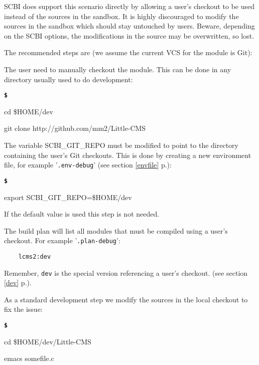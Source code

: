 \documentclass[a4paper,12pt,twoside]{article}
\newenvironment{shellcommand}{
	\begin{list}{ %
			\bfseries\texttt \$
		}{ %
			\ttfamily
			\setlength{\topsep}{-0.3ex}
			\setlength{\labelwidth}{1in}
			\setlength{\leftmargin}{0.7in}
			\setlength{\labelsep}{0.5ex}
			\setlength{\rightmargin}{0.5in}
			\setlength{\itemsep}{1ex}
			\setlength{\parsep}{0ex}
			\setlength{\listparindent}{0.5in}
		}
	}{
	\end{list}
}
\newcommand{\code}[1]{\texttt{#1}}
\newcommand{\seeref}[1]{see section \ref{#1} p.\pageref{#1}}
\newcommand{\file}[1]{'{\texttt{#1}}'}
\begin{document}
SCBI does support this scenario directly by allowing a user's checkout to be used instead of the sources in the sandbox. It is highly discouraged to modify the sources in the sandbox which should stay untouched by users. Beware, depending on the SCBI options, the modifications in the source may be overwritten, so lost.

The recommended steps are (we assume the current VCS for the module is Git):

\begin{description}[style=nextline]
	\item[Checkout the module] The user need to manually checkout the module. This can be done in any directory usually used to do development:

	\begin{shellcommand}
	\item cd \$HOME/dev
	\item git clone http://github.com/mm2/Little-CMS
	\end{shellcommand}

	\item[Setup SCBI enviroment] The variable SCBI\_GIT\_REPO must be modified to point to the directory containing the user's Git checkouts. This is done by creating a new environment file, for example \file{.env-debug} (\seeref{envfile}):

	\begin{shellcommand}
	\item export SCBI\_GIT\_REPO=\$HOME/dev
	\end{shellcommand}

	If the default value is used this step is not needed.

	\item[Create a build plan] The build plan will list all modules that must be compiled using a user's checkout. For example \file{.plan-debug}:

	\begin{lstlisting}
	lcms2:dev
	\end{lstlisting}

	Remember, \code{dev} is the special version referencing a user's checkout. (\seeref{dev}).

	\item[Modify the module's sources] As a standard development step we modify the sources in the local checkout to fix the issue:

	\begin{shellcommand}
	\item cd \$HOME/dev/Little-CMS
	\item emacs somefile.c
	\end{shellcommand}

\end{description}
\end{document}
